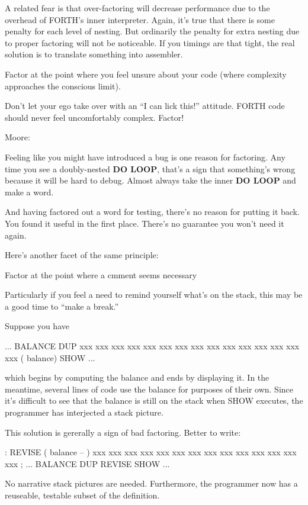 A related fear is that over-factoring will decrease performance due to the overhead of FORTH's inner interpreter. Again, it's true that there is some penalty for each level of nesting. But ordinarily the penalty for extra nesting due to proper factoring will not be noticeable. If you timings are that tight, the real solution is to translate something into assembler.

\begin{tip}
Factor at the point where you feel unsure about your code (where complexity approaches the conscious limit).
\end{tip}
Don't let your ego take over with an ``I can lick this!'' attitude. FORTH code should never feel uncomfortably complex. Factor!

\begin{interview}
Moore:

\begin{tfquot}
Feeling like you might have introduced a bug is one reason for factoring. Any time you see a doubly-nested \textbf{DO LOOP}, that's a sign that something's wrong because it will be hard to debug. Almost always take the inner \textbf{DO LOOP} and make a word.

And having factored out a word for testing, there's no reason for putting it back. You found it useful in the first place. There's no guarantee you won't need it again.
\end{tfquot}
\end{interview}
Here's another facet of the same principle:

\begin{tip}
Factor at the point where a cmment seems necessary
\end{tip}
Particularly if you feel a need to remind yourself what's on the stack, this may be a good time to ``make a break.''

\goodbreak
Suppose you have
\begin{Code}
... BALANCE  DUP xxx xxx xxx xxx xxx xxx xxx xxx xxx
     xxx xxx xxx xxx xxx xxx   ( balance) SHOW  ...
\end{Code}
which begins by computing the balance and ends by displaying it. In the meantime, several lines of code use the balance for purposes of their own. Since it's difficult to see that the balance is still on the stack when SHOW executes, the programmer has interjected a stack picture.

This solution is gererally a sign of bad factoring. Better to write:
\begin{Code}
: REVISE  ( balance -- )  xxx xxx xxx xxx xxx xxx xxx
     xxx xxx xxx xxx xxx xxx xxx ;
... BALANCE  DUP REVISE  SHOW  ...
\end{Code}
No narrative stack pictures are needed. Furthermore, the programmer now has a reuseable, testable subset of the definition.

